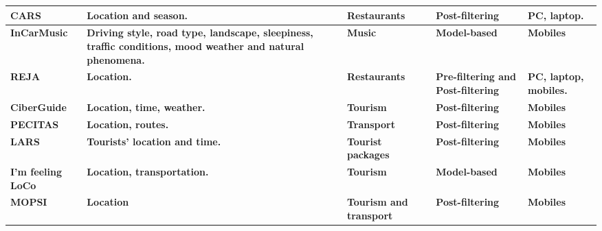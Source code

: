 \begin{sidewaystable}[]
\begin{tabular}{p{3.5cm} p{6cm} p{4cm} p{3cm} p{3cm} }
             \textbf{CARS} & \textbf{Location and season.} & \textbf{Restaurants} & 
             \textbf{Post-filtering} & \textbf{PC, laptop.} \\ \hline
             \textbf{InCarMusic} & \textbf{Driving style, road type, landscape, 
             sleepiness, traffic conditions, mood weather and natural phenomena.}
            & \textbf{Music} & \textbf{Model-based} & \textbf{Mobiles} \\ \hline
            \textbf{REJA} & \textbf{Location.} & \textbf{Restaurants} & 
            \textbf{Pre-filtering and Post-filtering} & \textbf{PC, laptop, mobiles.} \\ 
            \hline
            \textbf{CiberGuide} & \textbf{Location, time, weather.} & 
            \textbf{Tourism} & \textbf{Post-filtering} & \textbf{Mobiles} \\ \hline
            \textbf{PECITAS} & \textbf{Location, routes.} & \textbf{Transport} & 
            \textbf{Post-filtering} & \textbf{Mobiles} \\ \hline
            \textbf{LARS} & \textbf{Tourists’ location and time.} & 
            \textbf{Tourist packages} & \textbf{Post-filtering} & \textbf{Mobiles} \\ 
            \hline
            \textbf{I'm feeling LoCo} & \textbf{Location, transportation.} & 
            \textbf{Tourism} & \textbf{Model-based} & \textbf{Mobiles} \\ \hline
            \textbf{MOPSI} & \textbf{Location} & \textbf{Tourism and transport} & 
            \textbf{Post-filtering} & \textbf{Mobiles} \\ \hline
           \bottomrule
        \end{tabular}\hspace*{-1cm}
\end{sidewaystable}








